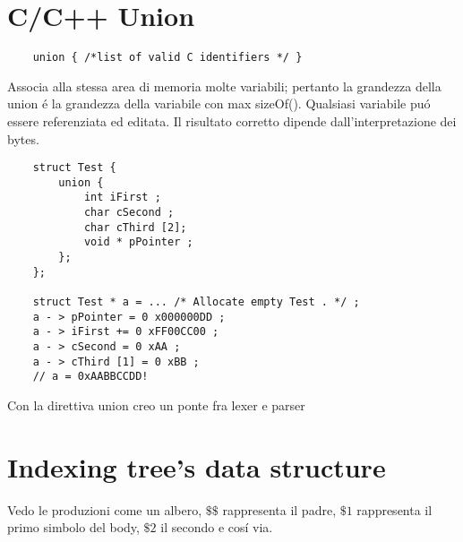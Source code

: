 \section{C/C++ Union}
\begin{lstlisting}
    union { /*list of valid C identifiers */ }
\end{lstlisting}
Associa alla stessa area di memoria molte variabili; pertanto la grandezza della union \'e la grandezza della variabile con max sizeOf().
Qualsiasi variabile pu\'o essere referenziata ed editata. Il risultato corretto dipende dall'interpretazione dei bytes.

\begin{lstlisting}
    struct Test {
        union {
            int iFirst ;
            char cSecond ;
            char cThird [2];
            void * pPointer ;
        };
    };

    struct Test * a = ... /* Allocate empty Test . */ ;
    a - > pPointer = 0 x000000DD ;     
    a - > iFirst += 0 xFF00CC00 ;    
    a - > cSecond = 0 xAA ;    
    a - > cThird [1] = 0 xBB ;
    // a = 0xAABBCCDD!
\end{lstlisting}

Con la direttiva union creo un ponte fra lexer e parser 

\section{Indexing tree's data structure}
Vedo le produzioni come un albero, $\$\$$ rappresenta il padre, $\$ 1$ rappresenta il primo simbolo del body, $\$ 2$ il secondo e cos\'i via.

